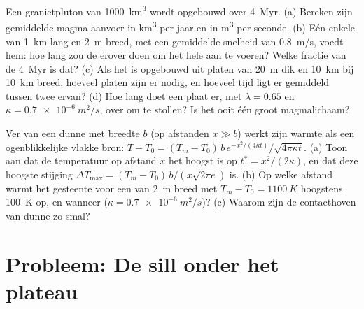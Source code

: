 \begin{exercise}[$\star\star\star$]\label{exo:b2:magma-emplacement:11}
Een granietpluton van \qty{1000}{km^3} wordt opgebouwd over \qty{4}{Myr}. (a) Bereken
zijn gemiddelde magma-aanvoer in \unit{km^3} per jaar en in \unit{m^3} per seconde. (b) Eén
enkele  van \qty{1}{km} lang en \qty{2}{m} breed, met een gemiddelde snelheid van
\qty{0.8}{m/s}, voedt hem: hoe lang zou de  erover doen om het hele
 aan te voeren? Welke fractie van de \qty{4}{Myr} is dat? (c) Als het  is opgebouwd uit
platen van \qty{20}{m} dik en \qty{10}{km} bij \qty{10}{km} breed, hoeveel platen
zijn er nodig, en hoeveel tijd ligt er gemiddeld tussen twee ervan? (d) Hoe lang doet een plaat er,
met $\lambda = 0.65$ en $\kappa = \qty{0.7e-6}{m^2/s}$, over om te
stollen? Is het  ooit één groot magmalichaam?
\end{exercise}

\begin{exercise}[$\star\star\star$]\label{exo:b2:magma-emplacement:12}
Ver van een dunne  met breedte $b$ (op afstanden $x \gg b$) werkt zijn warmte als een
ogenblikkelijke vlakke bron: $T - T_0 = (T_m - T_0)\,b\,e^{-x^2/(4\kappa
t)}/\sqrt{4\pi\kappa t}$. (a) Toon aan dat de temperatuur op afstand $x$ het hoogst is op
$t^* = x^2/(2\kappa)$, en dat deze hoogste stijging $\Delta T_{\max} = (T_m -
T_0)\,b/(x\sqrt{2\pi e})$ is. (b) Op welke afstand warmt het gesteente voor een  van \qty{2}{m} breed met $T_m - T_0 =
\qty{1100}{K}$ hoogstens \qty{100}{K} op, en
wanneer ($\kappa = \qty{0.7e-6}{m^2/s}$)? (c) Waarom zijn de contacthoven van dunne  zo
smal?
\end{exercise}

\section{Probleem: De sill onder het plateau}

